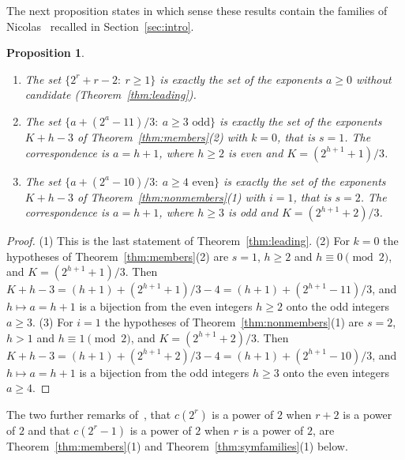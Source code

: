 \documentclass[11pt]{amsart}
\newtheorem{Proposition}[Theorem]{Proposition}
\theoremstyle{definition}
\begin{document}
The next proposition states in which sense these results contain the families of Nicolas~\cite{nicolas2005open} recalled in Section~\ref{sec:intro}.

\begin{Proposition}
\label{prop:nicolasfamilies}
\begin{enumerate}
\item The set $\{2^r+r-2:\ r\ge1\}$ is exactly the set of the exponents $a\ge0$ without candidate (Theorem~\ref{thm:leading}).
\item The set $\{a+(2^a-11)/3:\ a\ge3\text{ odd}\}$ is exactly the set of the exponents $K+h-3$ of Theorem~\ref{thm:members}(2) with $k=0$, that is $s=1$. The correspondence is $a=h+1$, where $h\ge2$ is even and $K=(2^{h+1}+1)/3$.
\item The set $\{a+(2^a-10)/3:\ a\ge4\text{ even}\}$ is exactly the set of the exponents $K+h-3$ of Theorem~\ref{thm:nonmembers}(1) with $i=1$, that is $s=2$. The correspondence is $a=h+1$, where $h\ge3$ is odd and $K=(2^{h+1}+2)/3$.
\end{enumerate}
\end{Proposition}
\begin{proof}
(1) This is the last statement of Theorem~\ref{thm:leading}. (2) For $k=0$ the hypotheses of Theorem~\ref{thm:members}(2) are $s=1$, $h\ge2$ and $h\equiv0\pmod2$, and $K=(2^{h+1}+1)/3$. Then $K+h-3=(h+1)+(2^{h+1}+1)/3-4=(h+1)+(2^{h+1}-11)/3$, and $h\mapsto a=h+1$ is a bijection from the even integers $h\ge2$ onto the odd integers $a\ge3$. (3) For $i=1$ the hypotheses of Theorem~\ref{thm:nonmembers}(1) are $s=2$, $h>1$ and $h\equiv1\pmod2$, and $K=(2^{h+1}+2)/3$. Then $K+h-3=(h+1)+(2^{h+1}+2)/3-4=(h+1)+(2^{h+1}-10)/3$, and $h\mapsto a=h+1$ is a bijection from the odd integers $h\ge3$ onto the even integers $a\ge4$.
\end{proof}

The two further remarks of~\cite{nicolas2005open}, that $c(2^r)$ is a power of $2$ when $r+2$ is a power of $2$ and that $c(2^r-1)$ is a power of $2$ when $r$ is a power of $2$, are Theorem~\ref{thm:members}(1) and Theorem~\ref{thm:symfamilies}(1) below.
\end{document}
